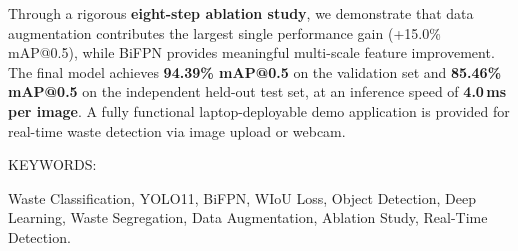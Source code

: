 \documentclass[BTech]{audiss}
\begin{document}
Through a rigorous \textbf{eight-step ablation study}, we demonstrate that data augmentation contributes the largest single performance gain (+15.0\% mAP@0.5), while BiFPN provides meaningful multi-scale feature improvement. The final model achieves \textbf{94.39\% mAP@0.5} on the validation set and \textbf{85.46\% mAP@0.5} on the independent held-out test set, at an inference speed of \textbf{4.0\,ms per image}. A fully functional laptop-deployable demo application is provided for real-time waste detection via image upload or webcam.

\noindent KEYWORDS: \hspace*{0.5em} \parbox[t]{4.4in}{Waste Classification, YOLO11, BiFPN, WIoU Loss, Object Detection, Deep Learning, Waste Segregation, Data Augmentation, Ablation Study, Real-Time Detection.}

\pagebreak

\begin{singlespace}
\tableofcontents
\thispagestyle{empty}
\end{singlespace}
\listoftables
{}
\listoffigures
{}
\end{document}
